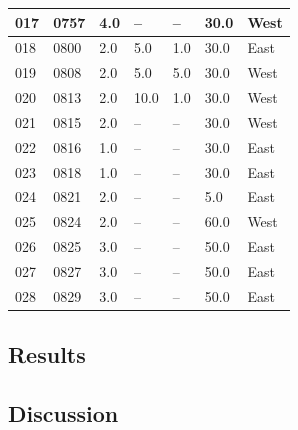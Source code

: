 \begin{center}
\begin{longtable}{| l | l | l | l | l | l | l |}
  \hline
  017 & 0757 & 4.0 & -- & -- & 30.0 & West \\
  \hline
  018 & 0800 & 2.0 & 5.0 & 1.0 & 30.0 & East \\
  \hline
  019 & 0808 & 2.0 & 5.0 & 5.0 & 30.0 & West \\
  \hline
  020 & 0813 & 2.0 & 10.0 & 1.0 & 30.0 & West \\
  \hline
  021 & 0815 & 2.0 & -- & -- & 30.0 & West \\
  \hline
  022 & 0816 & 1.0 & -- & -- & 30.0 & East \\
  \hline
  023 & 0818 & 1.0 & -- & -- & 30.0 & East \\
  \hline
  024 & 0821 & 2.0 & -- & -- & 5.0 & East \\
  \hline
  025 & 0824 & 2.0 & -- & -- & 60.0 & West \\
  \hline
  026 & 0825 & 3.0 & -- & -- & 50.0 & East \\
  \hline
  027 & 0827 & 3.0 & -- & -- & 50.0 & East \\
  \hline
  028 & 0829 & 3.0 & -- & -- & 50.0 & East \\
  \hline
  \end{longtable}

\end{center}


\subsection{Results} \label{rb:subsec:results}

\subsection{Discussion} \label{rb:subsec:discuss}




